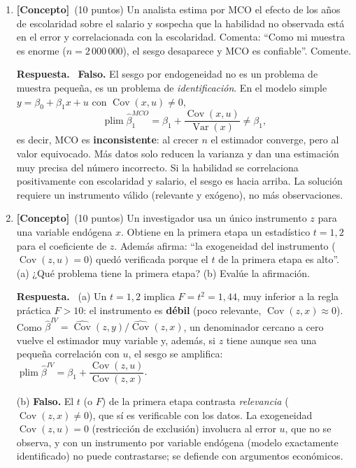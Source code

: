\documentclass[12pt,letterpaper]{article}
\DeclareMathOperator{\var}{Var}
\DeclareMathOperator{\cov}{Cov}
\DeclareMathOperator{\plim}{plim}
\newenvironment{resp}{\begingroup\color{blue}\par\noindent\textbf{Respuesta.}\ }{\par\endgroup}
\newcommand{\conc}{\textbf{[Concepto]}}
\begin{document}
\begin{enumerate}[1.]

\item \conc\ (10 puntos) Un analista estima por MCO el efecto de los años de escolaridad sobre el salario y sospecha que la habilidad no observada está en el error y correlacionada con la escolaridad. Comenta: ``Como mi muestra es enorme ($n=2\,000\,000$), el sesgo desaparece y MCO es confiable''. Comente.

\begin{resp}
\textbf{Falso.} El sesgo por endogeneidad no es un problema de muestra pequeña, es un problema de \emph{identificación}. En el modelo simple $y=\beta_0+\beta_1x+u$ con $\cov(x,u)\neq0$,
\[
\plim\hat\beta_1^{MCO}=\beta_1+\frac{\cov(x,u)}{\var(x)}\neq\beta_1,
\]
es decir, MCO es \textbf{inconsistente}: al crecer $n$ el estimador converge, pero al valor equivocado. Más datos solo reducen la varianza y dan una estimación muy precisa del número incorrecto. Si la habilidad se correlaciona positivamente con escolaridad y salario, el sesgo es hacia arriba. La solución requiere un instrumento válido (relevante y exógeno), no más observaciones.
\end{resp}

\item \conc\ (10 puntos) Un investigador usa un único instrumento $z$ para una variable endógena $x$. Obtiene en la primera etapa un estadístico $t=1{,}2$ para el coeficiente de $z$. Además afirma: ``la exogeneidad del instrumento ($\cov(z,u)=0$) quedó verificada porque el $t$ de la primera etapa es alto''. (a) ¿Qué problema tiene la primera etapa? (b) Evalúe la afirmación.

\begin{resp}
(a) Un $t=1{,}2$ implica $F=t^2=1{,}44$, muy inferior a la regla práctica $F>10$: el instrumento es \textbf{débil} (poco relevante, $\cov(z,x)\approx0$). Como $\hat\beta^{IV}=\widehat{\cov}(z,y)/\widehat{\cov}(z,x)$, un denominador cercano a cero vuelve el estimador muy variable y, además, si $z$ tiene aunque sea una pequeña correlación con $u$, el sesgo se amplifica: $\plim\hat\beta^{IV}=\beta_1+\dfrac{\cov(z,u)}{\cov(z,x)}$.

(b) \textbf{Falso.} El $t$ (o $F$) de la primera etapa contrasta \emph{relevancia} ($\cov(z,x)\neq0$), que sí es verificable con los datos. La exogeneidad $\cov(z,u)=0$ (restricción de exclusión) involucra al error $u$, que no se observa, y con un instrumento por variable endógena (modelo exactamente identificado) no puede contrastarse; se defiende con argumentos económicos.
\end{resp}


\end{enumerate}
\end{document}
